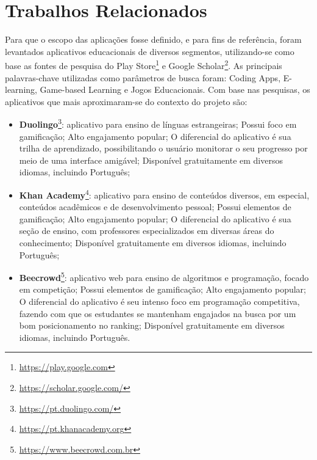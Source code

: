\section{Trabalhos Relacionados}
Para que o escopo das aplicações fosse definido, e para fins de referência, foram levantados aplicativos educacionais de diversos segmentos, utilizando-se como base as fontes de pesquisa do Play Store\footnote{\url{https://play.google.com}} e Google Scholar\footnote{\url{https://scholar.google.com/}}. As principais palavras-chave utilizadas como parâmetros de busca foram: Coding Apps, E-learning, Game-based Learning e Jogos Educacionais. Com base nas pesquisas, os aplicativos que mais aproximaram-se do contexto do projeto são:

\begin{itemize}
  \item \textbf{Duolingo}\footnote{\url{https://pt.duolingo.com/}}: aplicativo para ensino de línguas estrangeiras; Possui foco em gamificação; Alto engajamento popular; O diferencial do aplicativo é sua trilha de aprendizado, possibilitando o usuário monitorar o seu progresso por meio de uma interface amigável; Disponível gratuitamente em diversos idiomas, incluindo Português;
  \item \textbf{Khan Academy}\footnote{\url{https://pt.khanacademy.org}}: aplicativo para ensino de conteúdos diversos, em especial, conteúdos acadêmicos e de desenvolvimento pessoal; Possui elementos de gamificação; Alto engajamento popular; O diferencial do aplicativo é sua seção de ensino, com professores especializados em diversas áreas do conhecimento; Disponível gratuitamente em diversos idiomas, incluindo Português;
  \item \textbf{Beecrowd}\footnote{\url{https://www.beecrowd.com.br}}: aplicativo web para ensino de algoritmos e programação, focado em competição; Possui elementos de gamificação; Alto engajamento popular; O diferencial do aplicativo é seu intenso foco em programação competitiva, fazendo com que os estudantes se mantenham engajados na busca por um bom posicionamento no ranking; Disponível gratuitamente em diversos idiomas, incluindo Português.
\end{itemize}


